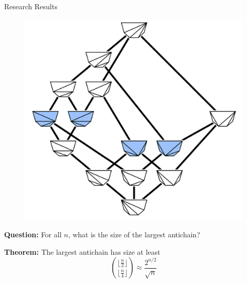 \documentclass[xcolor=x11names,compress,t]{beamer}
\begin{document}
\begin{frame}{Research Results}
     \begin{figure}
         \centering
         \includegraphics[scale = 0.08]{antichains_T.PNG}
     \end{figure}
     \textbf{Question:} For all $n$, what is the size of the largest antichain? \pause


      \textbf{Theorem:} The largest antichain has size at least \\
         
      \Large $$\binom{\lfloor\frac{n}{2}\rfloor}{\lfloor\frac{n}{4}\rfloor} \approx   \frac{2^{n/2}}{\sqrt{n}}$$
\end{frame}
\end{document}
